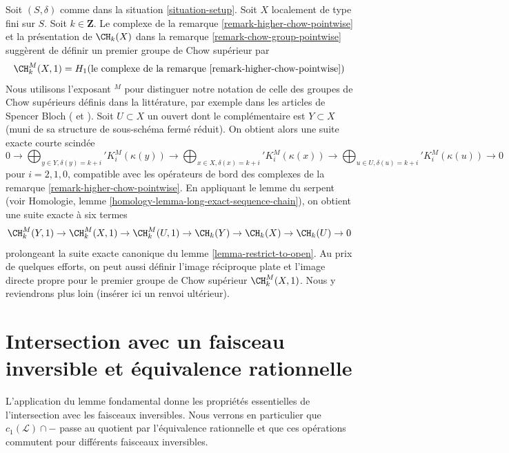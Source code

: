 \begin{remark}
\label{remark-higher-chow}
Soit $(S, \delta)$ comme dans la situation \ref{situation-setup}.
Soit $X$ localement de type fini sur $S$. Soit $k \in \mathbf{Z}$.
Le complexe de la remarque \ref{remark-higher-chow-pointwise} et la
présentation de $\CH_k(X)$ dans la remarque \ref{remark-chow-group-pointwise}
suggèrent de définir un premier groupe de Chow supérieur par
$$
\CH^M_k(X, 1) =
H_1(\text{le complexe de la remarque \ref{remark-higher-chow-pointwise}})
$$
Nous utilisons l'exposant ${}^M$ pour distinguer notre notation de celle des
groupes de Chow supérieurs définis dans la littérature, par exemple dans les articles
de Spencer Bloch (\cite{Bloch} et \cite{Bloch-moving}).
Soit $U \subset X$ un ouvert dont le complémentaire est $Y \subset X$ (muni de sa structure de
sous-schéma fermé réduit). On obtient alors une suite exacte courte scindée
$$
0 \to
\bigoplus\nolimits_{y \in Y, \delta(y) = k + i}' K_i^M(\kappa(y)) \to
\bigoplus\nolimits_{x \in X, \delta(x) = k + i}' K_i^M(\kappa(x)) \to
\bigoplus\nolimits_{u \in U, \delta(u) = k + i}' K_i^M(\kappa(u)) \to 0
$$
pour $i = 2, 1, 0$, compatible avec les opérateurs de bord des complexes
de la remarque \ref{remark-higher-chow-pointwise}. En appliquant le lemme du serpent
(voir Homologie, lemme \ref{homology-lemma-long-exact-sequence-chain}),
on obtient une suite exacte à six termes
$$
\CH^M_k(Y, 1) \to \CH^M_k(X, 1) \to \CH^M_k(U, 1) \to
\CH_k(Y) \to \CH_k(X) \to \CH_k(U) \to 0
$$
prolongeant la suite exacte canonique du lemme \ref{lemma-restrict-to-open}.
Au prix de quelques efforts, on peut aussi définir l'image réciproque plate et l'image directe propre
pour le premier groupe de Chow supérieur $\CH^M_k(X, 1)$. Nous y reviendrons
plus loin (insérer ici un renvoi ultérieur).
\end{remark}






\section{Intersection avec un faisceau inversible et équivalence rationnelle}
\label{section-commutativity}

\noindent
L'application du lemme fondamental donne les propriétés essentielles de l'intersection
avec les faisceaux inversibles. Nous verrons en particulier que
$c_1(\mathcal{L}) \cap -$ passe au quotient par l'équivalence rationnelle et
que ces opérations commutent pour différents faisceaux inversibles.

